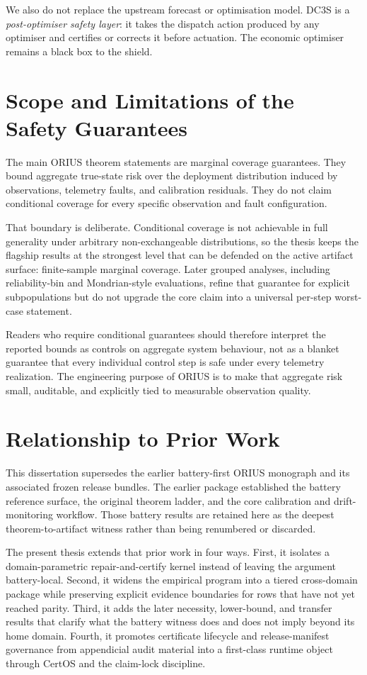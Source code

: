 We also do not replace the upstream forecast or optimisation model.  DC3S
is a \emph{post-optimiser safety layer}: it takes the dispatch action
produced by any optimiser and certifies or corrects it before actuation.
The economic optimiser remains a black box to the shield.

\section{Scope and Limitations of the Safety Guarantees}

The main ORIUS theorem statements are marginal coverage guarantees.  They
bound aggregate true-state risk over the deployment distribution induced by
observations, telemetry faults, and calibration residuals.  They do not claim
conditional coverage for every specific observation and fault configuration.

That boundary is deliberate.  Conditional coverage is not achievable in full
generality under arbitrary non-exchangeable distributions, so the thesis keeps
the flagship results at the strongest level that can be defended on the active
artifact surface: finite-sample marginal coverage.  Later grouped analyses,
including reliability-bin and Mondrian-style evaluations, refine that
guarantee for explicit subpopulations but do not upgrade the core claim into
a universal per-step worst-case statement.

Readers who require conditional guarantees should therefore interpret the
reported bounds as controls on aggregate system behaviour, not as a blanket
guarantee that every individual control step is safe under every telemetry
realization.  The engineering purpose of ORIUS is to make that aggregate risk
small, auditable, and explicitly tied to measurable observation quality.

\section{Relationship to Prior Work}

This dissertation supersedes the earlier battery-first ORIUS monograph and its
associated frozen release bundles.  The earlier package established the
battery reference surface, the original theorem ladder, and the core
calibration and drift-monitoring workflow.  Those battery results are retained
here as the deepest theorem-to-artifact witness rather than being renumbered
or discarded.

The present thesis extends that prior work in four ways.  First, it isolates a
domain-parametric repair-and-certify kernel instead of leaving the argument
battery-local.  Second, it widens the empirical program into a tiered
cross-domain package while preserving explicit evidence boundaries for rows
that have not yet reached parity.  Third, it adds the later necessity,
lower-bound, and transfer results that clarify what the battery witness does
and does not imply beyond its home domain.  Fourth, it promotes certificate
lifecycle and release-manifest governance from appendicial audit material into
a first-class runtime object through CertOS and the claim-lock discipline.

